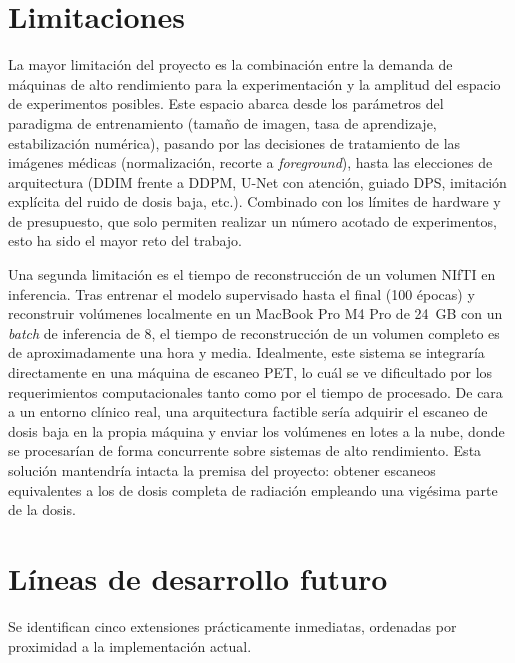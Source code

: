 \section{Limitaciones}
\label{sec:limitaciones}

La mayor limitación del proyecto es la combinación entre la
demanda de máquinas de alto rendimiento para la experimentación y
la amplitud del espacio de experimentos posibles. Este espacio
abarca desde los parámetros del paradigma de entrenamiento
(tamaño de imagen, tasa de aprendizaje, estabilización numérica),
pasando por las decisiones de tratamiento de las imágenes médicas
(normalización, recorte a \emph{foreground}), hasta las
elecciones de arquitectura (DDIM frente a DDPM, U-Net con
atención, guiado DPS, imitación explícita del ruido de dosis
baja, etc.). Combinado con los límites de hardware y de presupuesto, que solo
permiten realizar un número acotado de experimentos, esto ha sido
el mayor reto del trabajo. 

Una segunda limitación es el tiempo de reconstrucción de un
volumen NIfTI en inferencia. Tras entrenar el modelo supervisado
hasta el final (100 épocas) y reconstruir volúmenes localmente en
un MacBook Pro M4 Pro de 24~GB con un \textit{batch} de inferencia
de 8, el tiempo de reconstrucción de un volumen completo es de
aproximadamente una hora y media. Idealmente, este sistema se integraría 
directamente en una máquina de escaneo PET, lo cuál se ve dificultado por los
requerimientos computacionales tanto como por el tiempo de procesado.
De cara a un entorno clínico real, una arquitectura factible sería
adquirir el escaneo de dosis baja en la propia máquina y enviar
los volúmenes en lotes a la nube, donde se procesarían de forma
concurrente sobre sistemas de alto rendimiento. Esta solución
mantendría intacta la premisa del proyecto: obtener escaneos
equivalentes a los de dosis completa de radiación empleando una
vigésima parte de la dosis.

\section{Líneas de desarrollo futuro}
\label{sec:lineas-futuras}

Se identifican cinco extensiones prácticamente inmediatas, ordenadas por proximidad a la
implementación actual.

